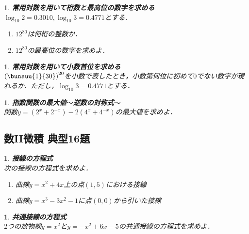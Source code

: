 \documentclass[10pt,
fleqn,
dvipdfmx,
uplatex
]{jsarticle}
\newtheorem{question}[Question]{}
\begin{document}
\begin{question}{\bf\boldmath 常用対数を用いて桁数と最高位の数字を求める}\\
$\log _{{10}}2=0.{3010}, \log _{{10}}3=0.{4771}$とする．
\begin{enumerate}
\item ${12}^{80}$は何桁の整数か．
\item ${12}^{80}$の最高位の数字を求めよ．
\end{enumerate}

\end{question}



\begin{question}{\bf\boldmath 常用対数を用いて小数首位を求める}\\
$\left(\bunsuu{1}{{}30}\right)^{{20}}$を小数で表したとき，小数第何位に初めて$0$でない数字が現れるか．ただし，$\log _{{10}}3=0.{4771}$とする．
\end{question}



\begin{question}{\bf\boldmath 指数関数の最大値$〜$逆数の対称式$〜$}\\
関数$y=\left(2^x+2^{-x}\right)-2\left(4^x+4^{-x}\right)$の最大値を求めよ．
\end{question}

\subsection{数II微積 典型16題}



\begin{question}{\bf\boldmath 接線の方程式}\\
次の接線の方程式を求めよ．
\begin{enumerate}
\item 曲線$y=x^2+4x$上の点$\left(1,5\right)$における接線
\item 曲線$y=x^3-3x^2-1$に点$\left(0,0\right)$から引いた接線
\end{enumerate}

\end{question}



\begin{question}{\bf\boldmath 共通接線の方程式}\\
$2$つの放物線$y=x^2$と$y=-x^2+6x-5$の共通接線の方程式を求めよ．
\end{question}
\end{document}
